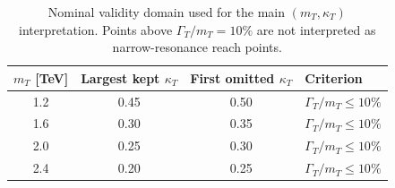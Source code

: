 \begin{table}[t]
\centering
\caption{Nominal validity domain used for the main $(m_T,\kappa_T)$ interpretation.
Points above $\Gamma_T/m_T=10\%$ are not interpreted as narrow-resonance reach points.}
\label{tab:width-validity-summary}
\begin{tabular}{cccl}
\toprule
$m_T$ [TeV] & Largest kept $\kappa_T$ & First omitted $\kappa_T$ & Criterion \\
\midrule
    1.2 & 0.45 & 0.50 & $\Gamma_T/m_T \le 10\%$ \\
    1.6 & 0.30 & 0.35 & $\Gamma_T/m_T \le 10\%$ \\
    2.0 & 0.25 & 0.30 & $\Gamma_T/m_T \le 10\%$ \\
    2.4 & 0.20 & 0.25 & $\Gamma_T/m_T \le 10\%$ \\
\bottomrule
\end{tabular}
\end{table}
